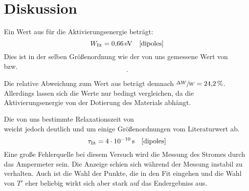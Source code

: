 \section{Diskussion}\label{sec:Diskussion}


Ein Wert aus \cite{dipoles} für die Aktivierungsenergie beträgt:
\begin{equation}
  W_\text{lit} = \SI{0.66}{\electronvolt} \quad \text{\cite{dipoles}}
\end{equation}
Dies ist in der selben Größenordnung wie der von uns gemessene Wert von
\begin{equation}
  
\end{equation}
bzw.
\begin{equation}
   .
\end{equation}

Die relative Abweichung zum Wert aus \cite{dipoles} beträgt demnach $\sfrac{\Delta W}{W}  = \SI{24.2}{\percent}$.
Allerdings lassen sich die Werte nur bedingt vergleichen, da die Aktivierungsenergie von der Dotierung des Materials abhängt.



Die von uns bestimmte Relaxationszeit von
\begin{equation}
  
\end{equation}
 weicht jedoch deutlich und um einige Größenordnungen vom Literaturwert ab.
\begin{equation}
  \tau_\text{lit} = \SI{4E-10}{\second} \quad \text{\cite{dipoles}}
\end{equation}
Eine große Fehlerquelle bei diesem Versuch wird die Messung des Stromes durch das
Ampermeter sein.
Die Anzeige schien sich während der Messung instabil zu verhalten.
Auch ist die Wahl der Punkte, die in den Fit eingehen und die Wahl von $T'$ eher beliebig wirkt sich aber stark auf das Endergebniss aus.
